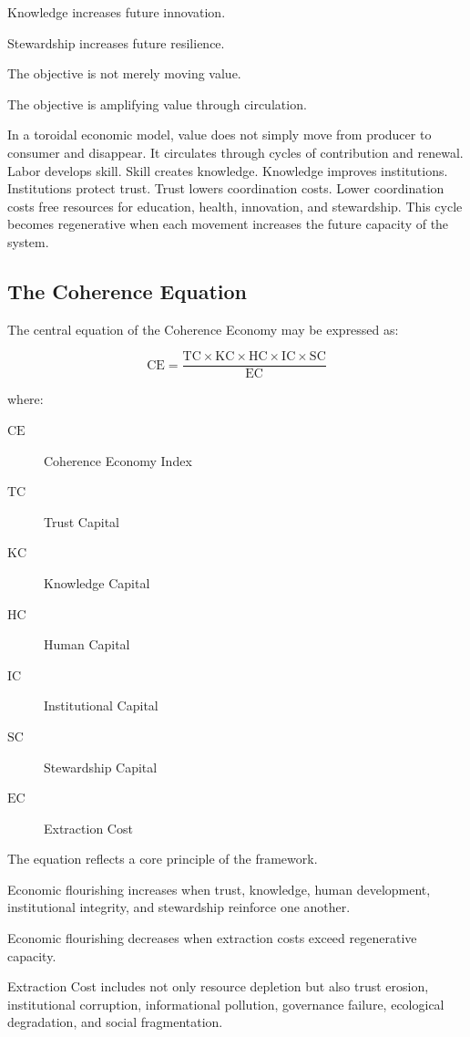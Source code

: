 \documentclass[12pt]{article}
\begin{document}
Knowledge increases future innovation.

Stewardship increases future resilience.

The objective is not merely moving value.

The objective is amplifying value through circulation.

In a toroidal economic model, value does not simply move from producer to consumer and disappear. It circulates through cycles of contribution and renewal. Labor develops skill. Skill creates knowledge. Knowledge improves institutions. Institutions protect trust. Trust lowers coordination costs. Lower coordination costs free resources for education, health, innovation, and stewardship. This cycle becomes regenerative when each movement increases the future capacity of the system.

\subsection{The Coherence Equation}

The central equation of the Coherence Economy may be expressed as:

\[
\mathrm{CE}=\frac{\mathrm{TC}\times \mathrm{KC}\times \mathrm{HC}\times \mathrm{IC}\times \mathrm{SC}}{\mathrm{EC}}
\]

where:

\begin{description}
  \item[\(\mathrm{CE}\)] Coherence Economy Index
  \item[\(\mathrm{TC}\)] Trust Capital
  \item[\(\mathrm{KC}\)] Knowledge Capital
  \item[\(\mathrm{HC}\)] Human Capital
  \item[\(\mathrm{IC}\)] Institutional Capital
  \item[\(\mathrm{SC}\)] Stewardship Capital
  \item[\(\mathrm{EC}\)] Extraction Cost
\end{description}

The equation reflects a core principle of the framework.

Economic flourishing increases when trust, knowledge, human development, institutional integrity, and stewardship reinforce one another.

Economic flourishing decreases when extraction costs exceed regenerative capacity.

Extraction Cost includes not only resource depletion but also trust erosion, institutional corruption, informational pollution, governance failure, ecological degradation, and social fragmentation.
\end{document}
